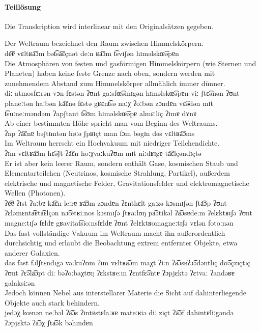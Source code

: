 
\paragraph*{Teillösung}

Die Transkription wird interlinear mit den Originalsätzen gegeben.

\begin{exe}
  \ex \gll Der Weltraum bezeichnet den Raum zwischen Himmelskörpern.\\
  de͡ɐ vɛltʁa͡ɔm bət͡sa͡ɛçnət deːn ʁa͡ɔm t͡svɪʃən hɪməlskœ͡əpɐn\\
  \ex \gll Die Atmosphären von festen und gasförmigen Himmelskörpern (wie Sternen und Planeten) haben keine feste Grenze nach oben, sondern werden mit zunehmendem Abstand zum Himmelskörper allmählich immer dünner.\\
  diː atmosfɛːrən vɔn fɛstən ʔʊnt gaːsfœ͡əmɪgən hɪməlskœ͡əpɐn viː ʃtɛ͡ənən ʔʊnt planeːtən haːbən ka͡ɛnə fɛstə gʁɛnt͡sə naːχ ʔoːbən zɔndɐn vɛ͡ədən mɪt t͡suːneːməndəm ʔapʃtant t͡sʊm hɪməlskœ͡əpɐ almɛːlɪç ʔɪmɐ dʏnɐ\\
  \ex \gll Ab einer bestimmten Höhe spricht man vom Beginn des Weltraums.\\
  ʔap ʔa͡ɛnɐ bəʃtɪmtən høːə ʃpʁɪçt man fɔm bəgɪn dəs vɛltʁa͡ɔms\\
  \ex \gll Im Weltraum herrscht ein Hochvakuum mit niedriger Teilchendichte.\\
  ʔɪm vɛltʁa͡ɔm hɛ͡əʃt ʔa͡ɛn hoːχvaːkuʔʊm mɪt niːdʁɪgɐ ta͡ɛlçəndɪçtə\\
  \ex \gll Er ist aber kein leerer Raum, sondern enthält Gase, kosmischen Staub und Elementarteilchen (Neutrinos, kosmische Strahlung, Partikel), außerdem elektrische und magnetische Felder, Gravitationsfelder und elektromagnetische Wellen (Photonen).\\
  ʔe͡ɐ ʔɪst ʔaːbɐ ka͡ɛn leːrɐ ʁa͡ɔm zɔndɐn ʔɛnthɛlt gaːzə kɔsmɪʃən ʃta͡ɔp ʔʊnt ʔɛləmɛnta͡ɐta͡ɛlçən nɔ͡œtʁiːnos kɔsmɪʃə ʃtʁaːlʊŋ pa͡ətikəl ʔa͡ɔsɐdeːm ʔelɛktʁɪʃə ʔʊnt magneːtɪʃə fɛldɐ gʁavitat͡sioːnsfɛldɐ ʔʊnt ʔelɛktʁomagneːtɪʃə vɛlən fotoːnən\\
  \ex \gll Das fast vollständige Vakuum im Weltraum macht ihn außerordentlich durchsichtig und erlaubt die Beobachtung extrem entfernter Objekte, etwa anderer Galaxien.\\
  das fast fɔlʃtɛndɪgə vaːkuʔʊm ʔɪm vɛltʁa͡ɔm maχt ʔiːn ʔa͡ɔsɐʔɔ͡ədəntlɪç dʊ͡əçzɪçtɪç ʔʊnt ʔɛ͡əla͡ɔpt diː bəʔoːbaχtʊŋ ʔɛkstʁeːm ʔɛntfɛ͡əntɐ ʔɔpjɛktə ʔɛtvaː ʔandəʁɐ galaksiːən\\
  \ex \gll Jedoch können Nebel aus interstellarer Materie die Sicht auf dahinterliegende Objekte auch stark behindern.\\
  jedɔχ kœnən neːbəl ʔa͡ɔs ʔɪntɐstɛlaːʁɐ mateːʁiə diː zɪçt ʔa͡ɔf dahɪntɐliːgəndə ʔɔpjɛktə ʔa͡ɔχ ʃta͡ək bəhɪndɐn\\
\end{exe}
